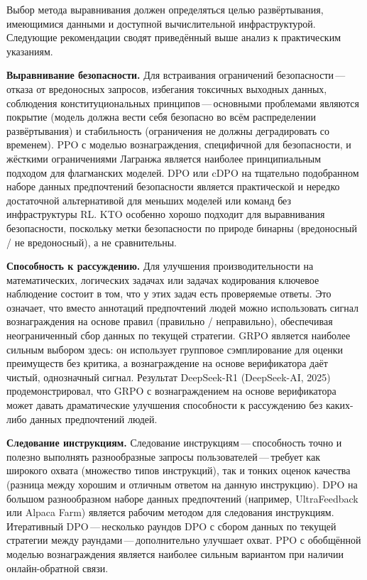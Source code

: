Выбор метода выравнивания должен определяться целью развёртывания, имеющимися данными и доступной вычислительной инфраструктурой. Следующие рекомендации сводят приведённый выше анализ к практическим указаниям.

\textbf{Выравнивание безопасности.} Для встраивания ограничений безопасности\,---\,отказа от вредоносных запросов, избегания токсичных выходных данных, соблюдения конституциональных принципов\,---\,основными проблемами являются покрытие (модель должна вести себя безопасно во всём распределении развёртывания) и стабильность (ограничения не должны деградировать со временем). PPO с моделью вознаграждения, специфичной для безопасности, и жёсткими ограничениями Лагранжа является наиболее принципиальным подходом для флагманских моделей. DPO или cDPO на тщательно подобранном наборе данных предпочтений безопасности является практической и нередко достаточной альтернативой для меньших моделей или команд без инфраструктуры RL. KTO особенно хорошо подходит для выравнивания безопасности, поскольку метки безопасности по природе бинарны (вредоносный / не вредоносный), а не сравнительны.

\textbf{Способность к рассуждению.} Для улучшения производительности на математических, логических задачах или задачах кодирования ключевое наблюдение состоит в том, что у этих задач есть проверяемые ответы. Это означает, что вместо аннотаций предпочтений людей можно использовать сигнал вознаграждения на основе правил (правильно / неправильно), обеспечивая неограниченный сбор данных по текущей стратегии. GRPO является наиболее сильным выбором здесь: он использует групповое сэмплирование для оценки преимуществ без критика, а вознаграждение на основе верификатора даёт чистый, однозначный сигнал. Результат DeepSeek-R1 (DeepSeek-AI, 2025) продемонстрировал, что GRPO с вознаграждением на основе верификатора может давать драматические улучшения способности к рассуждению без каких-либо данных предпочтений людей.

\textbf{Следование инструкциям.} Следование инструкциям\,---\,способность точно и полезно выполнять разнообразные запросы пользователей\,---\,требует как широкого охвата (множество типов инструкций), так и тонких оценок качества (разница между хорошим и отличным ответом на данную инструкцию). DPO на большом разнообразном наборе данных предпочтений (например, UltraFeedback или Alpaca Farm) является рабочим методом для следования инструкциям. Итеративный DPO\,---\,несколько раундов DPO с сбором данных по текущей стратегии между раундами\,---\,дополнительно улучшает охват. PPO с обобщённой моделью вознаграждения является наиболее сильным вариантом при наличии онлайн-обратной связи.

